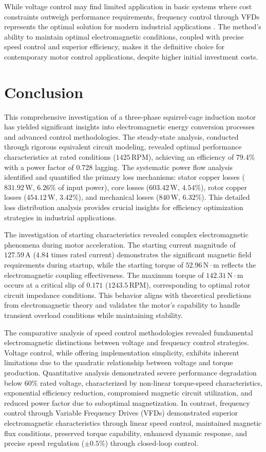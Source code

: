 \documentclass[a4paper,12pt]{article}
\begin{document}
While voltage control may find limited application in basic systems where cost constraints outweigh performance requirements, frequency control through VFDs represents the optimal solution for modern industrial applications \cite{chapman2021}. The method's ability to maintain optimal electromagnetic conditions, coupled with precise speed control and superior efficiency, makes it the definitive choice for contemporary motor control applications, despite higher initial investment costs.
 
 
 \section{Conclusion}
This comprehensive investigation of a three-phase squirrel-cage induction motor has yielded significant insights into electromagnetic energy conversion processes and advanced control methodologies. The steady-state analysis, conducted through rigorous equivalent circuit modeling, revealed optimal performance characteristics at rated conditions ($1425\,\text{RPM}$), achieving an efficiency of $79.4\%$ with a power factor of $0.728$ lagging. The systematic power flow analysis identified and quantified the primary loss mechanisms: stator copper losses ($831.92\,\text{W}$, $6.26\%$ of input power), core losses ($603.42\,\text{W}$, $4.54\%$), rotor copper losses ($454.12\,\text{W}$, $3.42\%$), and mechanical losses ($840\,\text{W}$, $6.32\%$). This detailed loss distribution analysis provides crucial insights for efficiency optimization strategies in industrial applications.

The investigation of starting characteristics revealed complex electromagnetic phenomena during motor acceleration. The starting current magnitude of $127.59\,\text{A}$ ($4.84$ times rated current) demonstrates the significant magnetic field requirements during startup, while the starting torque of $52.96\,\text{N}\cdot\text{m}$ reflects the electromagnetic coupling effectiveness. The maximum torque of $142.31\,\text{N}\cdot\text{m}$ occurs at a critical slip of $0.171$ ($1243.5\,\text{RPM}$), corresponding to optimal rotor circuit impedance conditions. This behavior aligns with theoretical predictions from electromagnetic theory and validates the motor's capability to handle transient overload conditions while maintaining stability.

The comparative analysis of speed control methodologies revealed fundamental electromagnetic distinctions between voltage and frequency control strategies. Voltage control, while offering implementation simplicity, exhibits inherent limitations due to the quadratic relationship between voltage and torque production. Quantitative analysis demonstrated severe performance degradation below $60\%$ rated voltage, characterized by non-linear torque-speed characteristics, exponential efficiency reduction, compromised magnetic circuit utilization, and reduced power factor due to suboptimal magnetization. In contrast, frequency control through Variable Frequency Drives (VFDs) demonstrated superior electromagnetic characteristics through linear speed control, maintained magnetic flux conditions, preserved torque capability, enhanced dynamic response, and precise speed regulation ($\pm0.5\%$) through closed-loop control.
\end{document}
